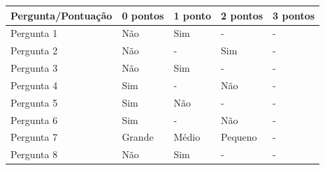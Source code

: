 \begin{table}[]
\centering
\label{my-label}
\begin{tabular}{|l|l|l|l|l|}
\hline
Pergunta/Pontuação & 0 pontos & 1 ponto                                                              & 2 pontos                                                           & 3 pontos                                                           \\ \hline
Pergunta 1         & Não      & Sim                                                                  & -                                                                  & -                                                                  \\ \hline
Pergunta 2         & Não      & -                                                                    & Sim                                                                & -                                                                  \\ \hline
Pergunta 3         & Não      & Sim                                                                  & -                                                                  & -                                                                  \\ \hline
Pergunta 4         & Sim      & -                                                                    & Não                                                                & -                                                                  \\ \hline
Pergunta 5         & Sim      & Não                                                                  & -                                                                  & -                                                                  \\ \hline
Pergunta 6         & Sim      & -                                                                    & Não                                                                & -                                                                  \\ \hline
Pergunta 7         & Grande   & Médio                                                                & Pequeno                                                            & -                                                                  \\ \hline
Pergunta 8         & Não      & Sim                                                                  & -                                                                  & -                                                                  \\ \hline

\end{tabular}
\end{table}

